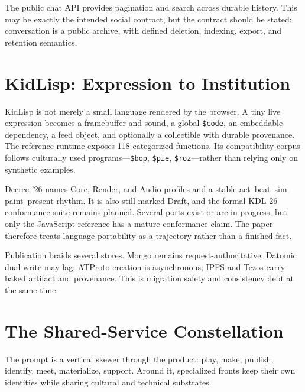 \documentclass[10pt,letterpaper,twocolumn]{article}
\begin{document}
The public chat API provides pagination and search across durable history. This may be exactly the intended social contract, but the contract should be stated: conversation is a public archive, with defined deletion, indexing, export, and retention semantics.


\section{KidLisp: Expression to Institution}

KidLisp is not merely a small language rendered by the browser. A tiny live expression becomes a framebuffer and sound, a global \texttt{\$code}, an embeddable dependency, a feed object, and optionally a collectible with durable provenance. The reference runtime exposes 118 categorized functions. Its compatibility corpus follows culturally used programs---\texttt{\$bop}, \texttt{\$pie}, \texttt{\$roz}---rather than relying only on synthetic examples.

Decree '26 names Core, Render, and Audio profiles and a stable act--beat--sim--paint--present rhythm. It is also still marked Draft, and the formal KDL-26 conformance suite remains planned. Several ports exist or are in progress, but only the JavaScript reference has a mature conformance claim. The paper therefore treats language portability as a trajectory rather than a finished fact.

Publication braids several stores. Mongo remains request-authoritative; Datomic dual-write may lag; ATProto creation is asynchronous; IPFS and Tezos carry baked artifact and provenance. This is migration safety and consistency debt at the same time.


\section{The Shared-Service Constellation}

The prompt is a vertical skewer through the product: play, make, publish, identify, meet, materialize, support. Around it, specialized fronts keep their own identities while sharing cultural and technical substrates.
\end{document}
